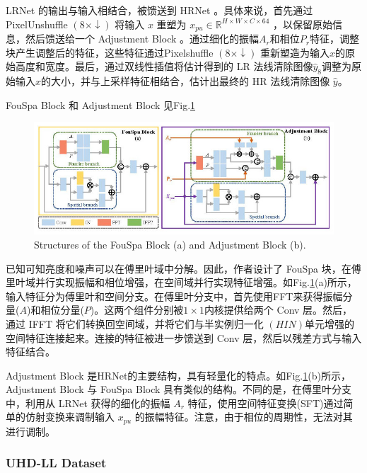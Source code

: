 \documentclass[letterpaper,10pt]{article}
\begin{document}
	LRNet 的输出与输入相结合，被馈送到 HRNet 。具体来说，首先通过 PixelUnshuffle $\left(8 \times \downarrow\right)$ 将输入 $x$ 重塑为 $x_{pu} \in \mathbb{R}^{H \times W \times C \times 64}$ ，以保留原始信息，然后馈送给一个 Adjustment Block 。通过细化的振幅$A_r$和相位$P_r$特征，调整块产生调整后的特征，这些特征通过Pixelshuffle $\left(8 \times \downarrow\right)$ 重新塑造为输入$x$的原始高度和宽度。最后，通过双线性插值将估计得到的 LR 法线清除图像$\hat{y}_8$调整为原始输入$x$的大小，并与上采样特征相结合，估计出最终的 HR 法线清除图像 $\hat{y}$。
		
	FouSpa Block 和 Adjustment Block 见Fig.\ref{fig: FouSpa and Adjustment}
	
	\begin{figure}[htbp]
		\centering 
		\includegraphics[width=0.8\columnwidth]{picture/FouSpa-and-Adjustment}
		\caption{
			\label{fig: FouSpa and Adjustment} Structures of the FouSpa Block (a) and Adjustment Block (b).
		}
	\end{figure}
	
	已知可知亮度和噪声可以在傅里叶域中分解。因此，作者设计了 FouSpa 块，在傅里叶域并行实现振幅和相位增强，在空间域并行实现特征增强。如Fig.\ref{fig: FouSpa and Adjustment}(a)所示，输入特征分为傅里叶和空间分支。在傅里叶分支中，首先使用FFT来获得振幅分量($A$)和相位分量($P$)。这两个组件分别被$1 \times 1$内核提供给两个 Conv 层。然后，通过 IFFT 将它们转换回空间域，并将它们与半实例归一化 $(HIN)$单元增强的空间特征连接起来。连接的特征被进一步馈送到 Conv 层，然后以残差方式与输入特征结合。
	
	Adjustment Block 是HRNet的主要结构，具有轻量化的特点。如Fig.\ref{fig: FouSpa and Adjustment}(b)所示，Adjustment Block 与 FouSpa Block 具有类似的结构。不同的是，在傅里叶分支中，利用从 LRNet 获得的细化的振幅 $A_r$ 特征，使用空间特征变换(SFT)通过简单的仿射变换来调制输入 $x_{pu}$ 的振幅特征。注意，由于相位的周期性，无法对其进行调制。
	
	\subsubsection{UHD-LL Dataset}
	
\end{document}
